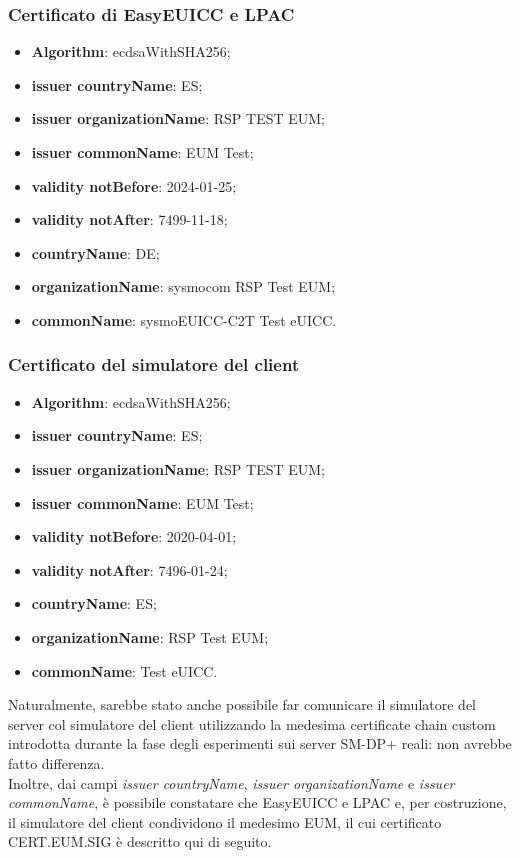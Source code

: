 \documentclass[10pt, oneside]{book}
\begin{document}
\subsubsection{Certificato di EasyEUICC e LPAC}
\begin{itemize}
\item \textbf{Algorithm}: ecdsaWithSHA256;
\item \textbf{issuer countryName}: ES;
\item \textbf{issuer organizationName}: RSP TEST EUM;
\item \textbf{issuer commonName}: EUM Test;
\item \textbf{validity notBefore}: 2024-01-25;
\item \textbf{validity notAfter}: 7499-11-18;
\item \textbf{countryName}: DE;
\item \textbf{organizationName}: sysmocom RSP Test EUM;
\item \textbf{commonName}: sysmoEUICC-C2T Test eUICC.
\end{itemize}

\subsubsection{Certificato del simulatore del client}
\begin{itemize}
\item \textbf{Algorithm}: ecdsaWithSHA256;
\item \textbf{issuer countryName}: ES;
\item \textbf{issuer organizationName}: RSP TEST EUM;
\item \textbf{issuer commonName}: EUM Test;
\item \textbf{validity notBefore}: 2020-04-01;
\item \textbf{validity notAfter}: 7496-01-24;
\item \textbf{countryName}: ES;
\item \textbf{organizationName}: RSP Test EUM;
\item \textbf{commonName}: Test eUICC.
\end{itemize}

\noindent Naturalmente, sarebbe stato anche possibile far comunicare il simulatore del server col simulatore del client utilizzando la medesima certificate chain custom introdotta durante la fase degli esperimenti sui server SM-DP+ reali: non avrebbe fatto differenza.\\
Inoltre, dai campi \textit{issuer countryName}, \textit{issuer organizationName} e \textit{issuer commonName}, è possibile constatare che EasyEUICC e LPAC e, per costruzione, il simulatore del client condividono il medesimo EUM, il cui certificato CERT.EUM.SIG è descritto qui di seguito.
\end{document}
